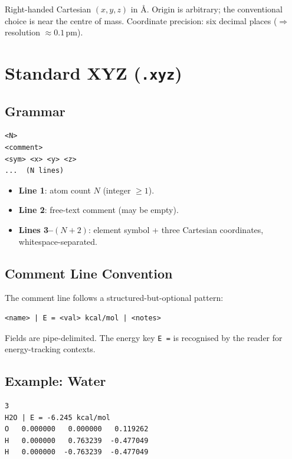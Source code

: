 \documentclass[12pt, a4paper, oneside]{article}
\begin{document}
Right-handed Cartesian $(x, y, z)$ in \AA.  Origin is arbitrary;
the conventional choice is near the centre of mass.  Coordinate
precision: six decimal places ($\Rightarrow$ resolution $\approx 0.1$\,pm).

\section{Standard XYZ (\texttt{.xyz})}
\label{sec:xyz}

\subsection{Grammar}

\begin{lstlisting}[language={},frame=single]
<N>
<comment>
<sym> <x> <y> <z>
...  (N lines)
\end{lstlisting}

\begin{itemize}
  \item \textbf{Line 1}: atom count $N$ (integer $\ge 1$).
  \item \textbf{Line 2}: free-text comment (may be empty).
  \item \textbf{Lines 3--$(N{+}2)$}: element symbol + three Cartesian
        coordinates, whitespace-separated.
\end{itemize}

\subsection{Comment Line Convention}

The comment line follows a structured-but-optional pattern:

\begin{lstlisting}[language={},frame=single]
<name> | E = <val> kcal/mol | <notes>
\end{lstlisting}

Fields are pipe-delimited.  The energy key \texttt{E =} is recognised
by the reader for energy-tracking contexts.

\subsection{Example: Water}

\begin{lstlisting}[language={},frame=single]
3
H2O | E = -6.245 kcal/mol
O   0.000000   0.000000   0.119262
H   0.000000   0.763239  -0.477049
H   0.000000  -0.763239  -0.477049
\end{lstlisting}
\end{document}
